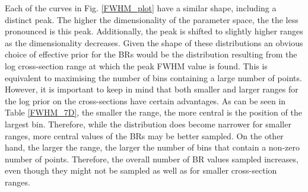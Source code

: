 \documentclass{article}
\begin{document}
Each of the curves in Fig. \ref{FWHM_plot} have a similar shape, including a distinct peak. The higher the dimensionality of the parameter space, the the less pronounced is this peak. Additionally, the peak is shifted to slightly higher ranges as the dimensionality decreases. Given the shape of these distributions an obvious choice of effective prior for the BRs would be the distribution resulting from the log cross-section range at which the peak FWHM value is found. This is equivalent to maximising the number of bins containing a large number of points. However, it is important to keep in mind that both smaller and larger ranges for the log prior on the cross-sections have certain advantages. As can be seen in Table \ref{FWHM_7D}, the smaller the range, the more central is the position of the largest bin. Therefore, while the distribution does become narrower for smaller ranges, more central values of the BRs may be better sampled. On the other hand, the larger the range, the larger the number of bins that contain a non-zero number of points. Therefore, the overall number of BR values sampled increases, even though they might not be sampled as well as for smaller cross-section ranges.
\end{document}
